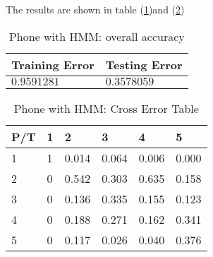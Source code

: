 \begin{itemize}
The results are shown in table (\ref{tab:phoneHMM1})and (\ref{tab:phoneHMM2})
\begin{table}
\begin{center}
\begin{tabular}{|l|l|}
      \hline
      Training Error & Testing Error\\
      \hline
      $0.9591281$ & $0.3578059$ \\
      \hline
\end{tabular}
\caption{Phone with HMM: overall accuracy}
\label{tab:phoneHMM1}
\end{center}
\end{table}
\begin{table}
\begin{center}
\begin{tabular}{|l|l|l|l|l|l|}
      \hline
      P/T& 1 & 2 &3 & 4 & 5 \\
      \hline
      1 &1&0.014&0.064&0.006&0.000\\
      2 &0&0.542&0.303&0.635&0.158\\
      3 &0&0.136&0.335&0.155&0.123\\
      4 &0&0.188&0.271&0.162&0.341\\
      5 & 0&0.117&0.026&0.040&0.376\\
      \hline
\end{tabular}
\caption{Phone with HMM: Cross Error Table}
\label{tab:phoneHMM2}
\end{center}
\end{table}

\end{itemize}

